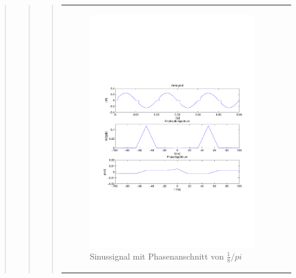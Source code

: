 \begin{quote}
\begin{quote}
\begin{quote}
\begin{center}
\begin{tabular}{ll}
\begin{minipage}{0.6\textwidth}
                        \begin{figure}[H]
                            \label{fig:}
                            \includegraphics[scale=0.5, trim = 2cm 7cm 1.5cm 8.5cm, clip]{./Bilder/Phasenanschnitt18pi.pdf}
                            \caption{Sinussignal mit Phasenanschnitt von $\frac{1}{8}/pi$}
                        \end{figure}
                    \vspace{-1.5em}
    
                    \end{minipage}
    
                \end{tabular}
                \end{center}
    

\end{quote}
\end{quote}
\end{quote}

